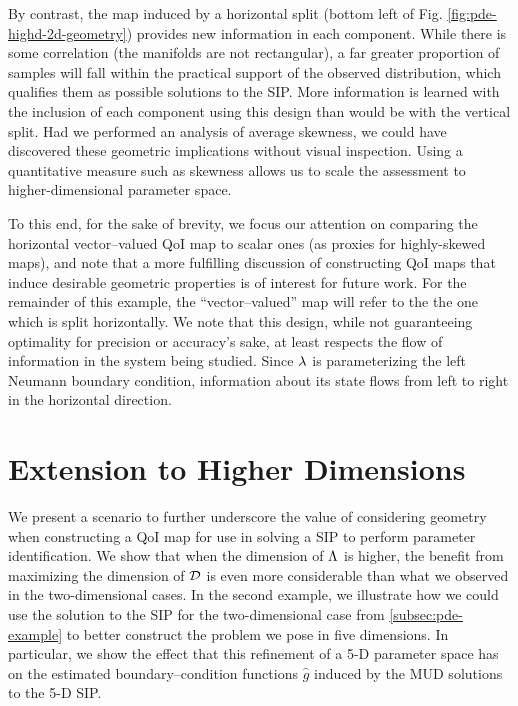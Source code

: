 By contrast, the map induced by a horizontal split (bottom left of Fig. \ref{fig:pde-highd-2d-geometry}) provides new information in each component.
While there is some correlation (the manifolds are not rectangular), a far greater proportion of samples will fall within the practical support of the observed distribution, which qualifies them as possible solutions to the SIP.
More information is learned with the inclusion of each component using this design than would be with the vertical split.
Had we performed an analysis of average skewness, we could have discovered these geometric implications without visual inspection.
Using a quantitative measure such as skewness allows us to scale the assessment to higher-dimensional parameter space.

To this end, for the sake of brevity, we focus our attention on comparing the horizontal vector--valued QoI map to scalar ones (as proxies for highly-skewed maps), and note that a more fulfilling discussion of constructing QoI maps that induce desirable geometric properties is of interest for future work.
For the remainder of this example, the ``vector--valued'' map will refer to the the one which is split horizontally.
We note that this design, while not guaranteeing optimality for precision or accuracy's sake, at least respects the flow of information in the system being studied.
Since $\lambda$ is parameterizing the left Neumann boundary condition, information about its state flows from left to right in the horizontal direction.

\FloatBarrier
\section{Extension to Higher Dimensions}
We present a scenario to further underscore the value of considering geometry when constructing a QoI map for use in solving a SIP to perform parameter identification.
We show that when the dimension of ${\Lambda}$ is higher, the benefit from maximizing the dimension of $\mathcal{D}$ is even more considerable than what we observed in the two-dimensional cases.
In the second example, we illustrate how we could use the solution to the SIP for the two-dimensional case from \ref{subsec:pde-example} to better construct the problem we pose in five dimensions.
In particular, we show the effect that this refinement of a 5-D parameter space has on the estimated boundary--condition functions $\widehat{g}$ induced by the MUD solutions to the 5-D SIP.

